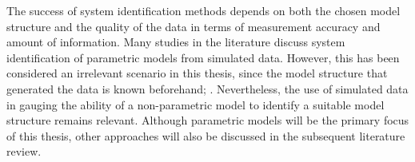 The success of system identification methods depends on both the chosen model structure and the quality of the data in terms of measurement accuracy and amount of information. Many studies in the literature discuss system identification of parametric models from simulated data. However, this has been considered an irrelevant scenario in this thesis, since the model structure that generated the data is known beforehand;  \cite{millerShipModelIdentification2021}. Nevertheless, the use of simulated data in gauging the ability of a non-parametric model to identify a suitable model structure remains relevant. Although parametric models will be the primary focus of this thesis, other approaches will also be discussed in the subsequent literature review.

